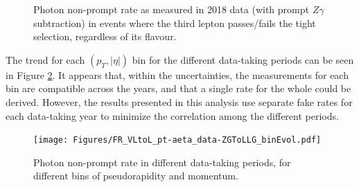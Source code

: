 \begin{figure}
%
\caption{Photon non-prompt rate as measured in 2018 data (with prompt $Z\gamma$ subtraction) in events where the third lepton passes/fails the tight selection, regardless of its flavour.}
\label{fig:phFR_PF}
\end{figure}

The trend for each $(p_{T}, |\eta|)$ bin for the different data-taking periods can be seen in Figure \ref{fig:phFR_time}.
It appears that, within the uncertainties, the measurements for each bin are compatible across the years,
and that a single rate for the whole  could be derived.
However, the results presented in this analysis use separate fake rates for each data-taking year
to minimize the correlation among the different periods.

\begin{figure}
\centering
\texttt{[image: Figures/FR\_VLtoL\_pt-aeta\_data-ZGToLLG\_binEvol.pdf]}
\caption{Photon non-prompt rate in different data-taking periods, for different bins of pseudorapidity and momentum.}
\label{fig:phFR_time}
\end{figure}


